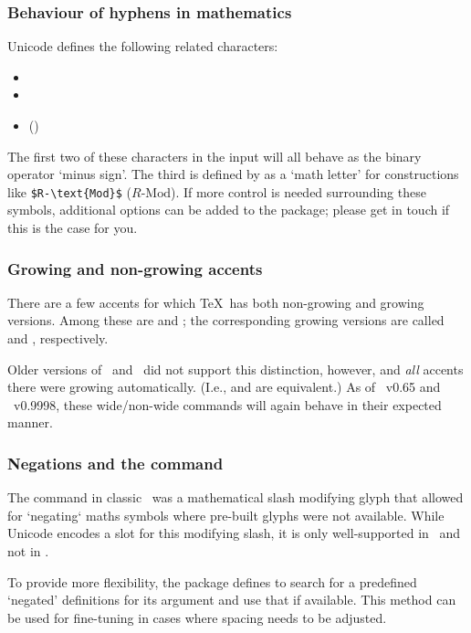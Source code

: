 \subsubsection{Behaviour of hyphens in mathematics}

Unicode defines the following related characters:
\begin{itemize}
\item {}
\item {}
\item {} ()
\end{itemize}
The first two of these characters in the input will all behave as the binary operator
`minus sign'.
The third is defined by  as a `math letter' for constructions
like \verb|$R‐\text{Mod}$| ($R‐\text{Mod}$).
If more control is needed surrounding these symbols, additional options can be added to the package;
please get in touch if this is the case for you.


\subsubsection{Growing and non-growing accents}

There are a few accents for which \TeX\ has both non-growing and growing
versions.  Among these are  and ; the corresponding growing
versions are called  and , respectively.

Older versions of \XeTeX\ and \LuaTeX\ did not support this distinction,
however, and \emph{all} accents there were growing automatically. (I.e.,
 and  are equivalent.) As of \LuaTeX\ v0.65 and \XeTeX\
v0.9998, these wide/non-wide commands will again behave in their expected
manner.


\subsubsection{Negations and the  command}

The  command in classic \LaTeXe\ was a mathematical slash modifying glyph that allowed for `negating` maths symbols where pre-built glyphs were not available. While Unicode encodes a slot for this modifying slash, it is only well-supported in \LuaTeX\ and not in \XeTeX.

To provide more flexibility, the  package defines  to search for a predefined `negated' definitions for its argument and use that if available. This method can be used for fine-tuning in cases where spacing needs to be adjusted.

